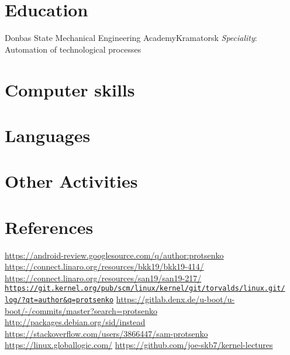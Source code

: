 \documentclass[11pt,a4paper]{moderncv}
\begin{document}
\section{Education}
  {Donbas State Mechanical Engineering Academy}{Kramatorsk}{}
  {\textit{Speciality}: Automation of technological processes}

\section{Computer skills}

\pagebreak

\section{Languages}

\section{Other Activities}


\section{References}

\begin{thebibliography}{9}
 {\color{web} \url{https://android-review.googlesource.com/q/author:protsenko}}
 {\color{web} \url{https://connect.linaro.org/resources/bkk19/bkk19-414/}}
 {\color{web} \url{https://connect.linaro.org/resources/san19/san19-217/}}
 {\color{web} \href{https://git.kernel.org/pub/scm/linux/kernel/git/torvalds/linux.git/log/?qt=author&q=protsenko}
                      {\texttt{https://git.kernel.org/pub/scm/linux/kernel/git/torvalds/linux.git/\\log/?qt=author\&q=protsenko}}}
 {\color{web} \url{https://gitlab.denx.de/u-boot/u-boot/-/commits/master?search=protsenko}}
 {\color{web} \url{http://packages.debian.org/sid/instead}}
 {\color{web} \url{https://stackoverflow.com/users/3866447/sam-protsenko}}
 {\color{web} \url{https://linux.globallogic.com/}}
 {\color{web} \url{https://github.com/joe-skb7/kernel-lectures}}
\end{thebibliography}
\end{document}
